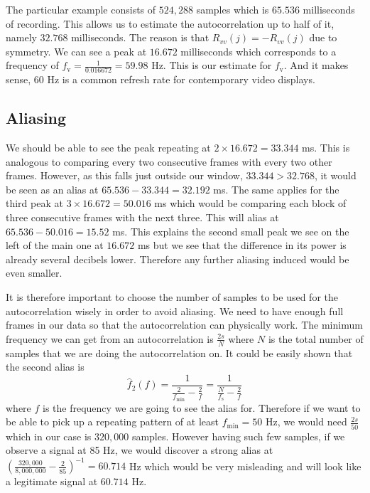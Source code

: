 \documentclass[a4paper,12pt,twoside,openright]{report}
\begin{document}
The particular example consists of $524,288$ samples which is $65.536$ milliseconds of recording. This allows us to estimate the autocorrelation up to half of it, namely $32.768$ milliseconds. The reason is that $R_{vv}(j)=-R_{vv}(j)$ due to symmetry. We can see a peak at $16.672$ milliseconds which corresponds to a frequency of $f_\text{v} = \frac{1}{0.016672} = 59.98$ Hz. This is our estimate for $f_\text{v}$. And it makes sense, $60$ Hz is a common refresh rate for contemporary video displays.

\subsection{Aliasing}
We should be able to see the peak repeating at $2 \times 16.672 = 33.344$ ms. This is analogous to comparing every two consecutive frames with every two other frames. However, as this falls just outside our window, $33.344 > 32.768$, it would be seen as an alias at $65.536-33.344 = 32.192$ ms. The same applies for the third peak at $3 \times 16.672 = 50.016$ ms which would be comparing each block of three consecutive frames with the next three. This will alias at $65.536 - 50.016 = 15.52$ ms. This explains the second small peak we see on the left of the main one at $16.672$ ms but we see that the difference in its power is already several decibels lower. Therefore any further aliasing induced would be even smaller.

It is therefore important to choose the number of samples to be used for the autocorrelation wisely in order to avoid aliasing. We need to have enough full frames in our data so that the autocorrelation can physically work. The minimum frequency we can get from an autocorrelation is $\frac{2 s}{N}$ where $N$ is the total number of samples that we are doing the autocorrelation on. It could be easily shown that the second alias is
\begin{equation}
\hat{f}_{2}(f) = \frac{1}{\frac{2}{f_\text{min}}-\frac{2}{f}} = \frac{1}{\frac{N}{f_\text{s}}-\frac{2}{f}}
\end{equation}
where $f$ is the frequency we are going to see the alias for. Therefore if we want to be able to pick up a repeating pattern of at least $f_\text{min} = 50$ Hz, we would need $\frac{2 s}{50}$ which in our case is $320,000$ samples. However having such few samples, if we observe a signal at 85 Hz, we would discover a strong alias at $\left( \frac{320,000}{8,000,000}-\frac{2}{85} \right)^{-1} = 60.714$ Hz which would be very misleading and will look like a legitimate signal at $60.714$ Hz. 
\end{document}
